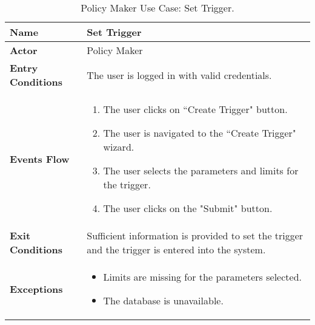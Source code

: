 
\begin{table}
\centering
\small
\caption{\label{tab:policyUseTrigger}Policy Maker Use Case: Set Trigger.}
\renewcommand{\arraystretch}{1.25}
\begin{tabular}{|l|>{\raggedright\arraybackslash}m{12cm}|}

    \hline
    \textbf{Name} & Set Trigger\\
    \hline
   	\textbf{Actor} & Policy Maker\\
    \hline
    \textbf{Entry Conditions} & The user is logged in with valid credentials.\\
    \hline
    \textbf{Events Flow} & 
    \begin{enumerate}
	    \item The user clicks on “Create Trigger" button.
    	\item The user is navigated to the “Create Trigger" wizard.
    	\item The user selects the parameters and limits for the trigger.
    	\item The user clicks on the "Submit" button.
    \end{enumerate} \\ \hline
    \textbf{Exit Conditions} & Sufficient information is provided to set the trigger and the trigger is entered into the system.\\
    \hline
    \textbf{Exceptions} & \begin{itemize}
    	\item Limits are missing for the parameters selected.
    	\item The database is unavailable.
    \end{itemize}\\
    \hline
\end{tabular}
\end{table}